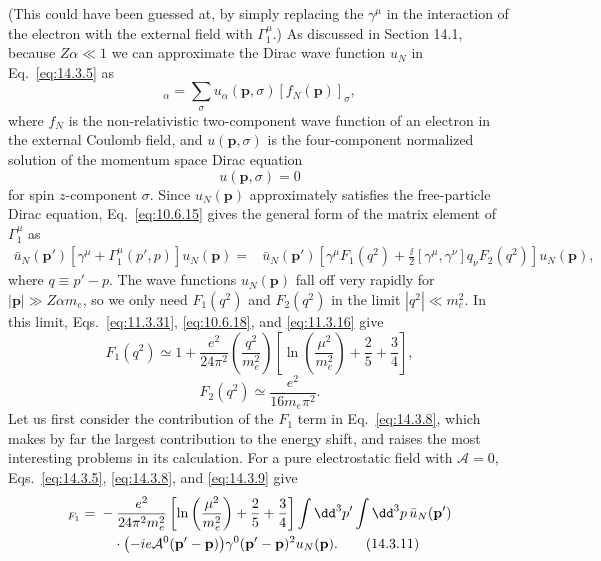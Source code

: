(This could have been guessed at, by simply replacing the $\gamma^\mu$ in the
interaction of the electron with the external field with $\Gamma_1^\mu$.) As
discussed in Section 14.1, because $Z\alpha\ll1$ we can approximate the Dirac
wave function $u_N$ in Eq.~\eqref{eq:14.3.5} as
\begin{equation}
[u_N(\mathbf p)]_\alpha=\sum_\sigma u_\alpha(\mathbf p,\sigma)
[f_N(\mathbf p)]_\sigma,
\tag{14.3.6}\label{eq:14.3.6}
\end{equation}
where $f_N$ is the non-relativistic two-component wave function of an electron
in the external Coulomb field, and $u(\mathbf p,\sigma)$ is the four-component
normalized solution of the momentum space Dirac equation
\begin{equation}
[\ii\gamma_\mu p^\mu+m_e]u(\mathbf p,\sigma)=0
\tag{14.3.7}\label{eq:14.3.7}
\end{equation}
for spin $z$-component $\sigma$. Since $u_N(\mathbf p)$ approximately
satisfies the free-particle Dirac equation, Eq.~\eqref{eq:10.6.15} gives the
general form of the matrix element of $\Gamma_1^\mu$ as
\begin{align}
\bar u_N(\mathbf p')[\gamma^\mu+\Gamma_1^\mu(p',p)]u_N(\mathbf p)
={}&\bar u_N(\mathbf p')
\left[\gamma^\mu F_1(q^2)+\frac{\ii}{2}[\gamma^\mu,\gamma^\nu]q_\nu
F_2(q^2)\right]u_N(\mathbf p),
\tag{14.3.8}\label{eq:14.3.8}
\end{align}
where $q\equiv p'-p$. The wave functions $u_N(\mathbf p)$ fall off very rapidly
for $|\mathbf p|\gg Z\alpha m_e$, so we only need $F_1(q^2)$ and $F_2(q^2)$ in
the limit $|q^2|\ll m_e^2$. In this limit, Eqs.~\eqref{eq:11.3.31},
\eqref{eq:10.6.18}, and \eqref{eq:11.3.16} give
\begin{equation}
F_1(q^2)\simeq1+\frac{e^2}{24\pi^2}\left(\frac{q^2}{m_e^2}\right)
\left[\ln\left(\frac{\mu^2}{m_e^2}\right)+\frac25+\frac34\right],
\tag{14.3.9}\label{eq:14.3.9}
\end{equation}
\begin{equation}
F_2(q^2)\simeq\frac{e^2}{16m_e\pi^2}.
\tag{14.3.10}\label{eq:14.3.10}
\end{equation}
Let us first consider the contribution of the $F_1$ term in
Eq.~\eqref{eq:14.3.8}, which makes by far the largest contribution to the
energy shift, and raises the most interesting problems in its calculation.
For a pure electrostatic field with $\boldsymbol{\mathcal A}=0$,
Eqs.~\eqref{eq:14.3.5}, \eqref{eq:14.3.8}, and \eqref{eq:14.3.9} give
\begin{align}
[\delta E_N]_{F_1}={}&-\frac{e^2}{24\pi^2m_e^2}
\left[\ln\left(\frac{\mu^2}{m_e^2}\right)+\frac25+\frac34\right]
\int \dd^3p'\int \dd^3p\,\bar u_N(\mathbf p')
\notag\\
&\quad\cdot
\bigl(-ie\mathcal A^0(\mathbf p'-\mathbf p)\bigr)
\gamma^0(\mathbf p'-\mathbf p)^2u_N(\mathbf p).
\tag{14.3.11}\label{eq:14.3.11}
\end{align}

